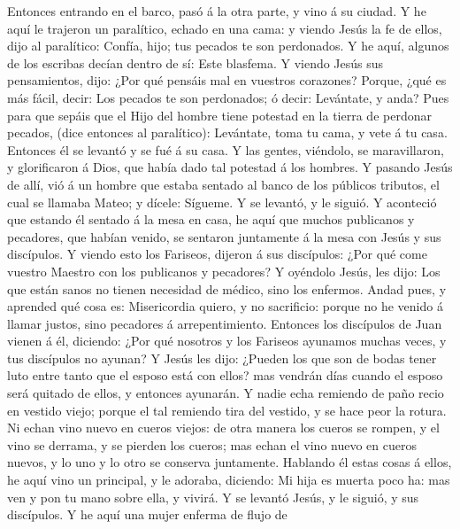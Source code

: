  Entonces entrando en el barco, pasó á la otra parte, y vino
á su ciudad.  Y he aquí le trajeron un paralítico, echado en
una cama: y viendo Jesús la fe de ellos, dijo al paralítico: Confía,
hijo; tus pecados te son perdonados.  Y he aquí, algunos de
los escribas decían dentro de sí: Este blasfema.  Y viendo
Jesús sus pensamientos, dijo: ¿Por qué pensáis mal en vuestros
corazones?  Porque, ¿qué es más fácil, decir: Los pecados te
son perdonados; ó decir: Levántate, y anda?  Pues para que
sepáis que el Hijo del hombre tiene potestad en la tierra de perdonar
pecados, (dice entonces al paralítico): Levántate, toma tu cama, y vete
á tu casa.  Entonces él se levantó y se fué á su casa.
 Y las gentes, viéndolo, se maravillaron, y glorificaron á
Dios, que había dado tal potestad á los hombres.  Y pasando
Jesús de allí, vió á un hombre que estaba sentado al banco de los
públicos tributos, el cual se llamaba Mateo; y dícele: Sígueme. Y se
levantó, y le siguió.  Y aconteció que estando él sentado á
la mesa en casa, he aquí que muchos publicanos y pecadores, que habían
venido, se sentaron juntamente á la mesa con Jesús y sus discípulos.
 Y viendo esto los Fariseos, dijeron á sus discípulos: ¿Por
qué come vuestro Maestro con los publicanos y pecadores?  Y
oyéndolo Jesús, les dijo: Los que están sanos no tienen necesidad de
médico, sino los enfermos.  Andad pues, y aprended qué cosa
es: Misericordia quiero, y no sacrificio: porque no he venido á llamar
justos, sino pecadores á arrepentimiento.  Entonces los
discípulos de Juan vienen á él, diciendo: ¿Por qué nosotros y los
Fariseos ayunamos muchas veces, y tus discípulos no ayunan?
 Y Jesús les dijo: ¿Pueden los que son de bodas tener luto
entre tanto que el esposo está con ellos? mas vendrán días cuando el
esposo será quitado de ellos, y entonces ayunarán.  Y nadie
echa remiendo de paño recio en vestido viejo; porque el tal remiendo
tira del vestido, y se hace peor la rotura.  Ni echan vino
nuevo en cueros viejos: de otra manera los cueros se rompen, y el vino
se derrama, y se pierden los cueros; mas echan el vino nuevo en cueros
nuevos, y lo uno y lo otro se conserva juntamente. 
Hablando él estas cosas á ellos, he aquí vino un principal, y le
adoraba, diciendo: Mi hija es muerta poco ha: mas ven y pon tu mano
sobre ella, y vivirá.  Y se levantó Jesús, y le siguió, y
sus discípulos.  Y he aquí una mujer enferma de flujo de
